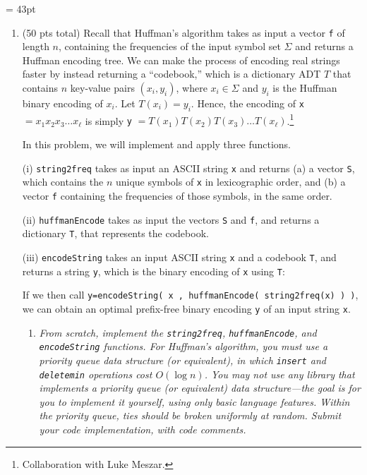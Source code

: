\documentclass[12pt]{article}
\begin{document}
\renewcommand{\headrulewidth}{0.4pt}
\headheight = 43pt

\renewcommand{\arraystretch}{1.5}

\vspace{-3mm}
\begin{enumerate}
		 
	\item \label{q:1} (50 pts total) Recall that Huffman's algorithm takes as input a vector {\tt f} of length $n$, containing the frequencies of the input symbol set $\Sigma$ and returns a Huffman encoding tree. We can make 
the process of encoding real strings faster by instead returning a ``codebook,'' which is a dictionary ADT $T$ that contains $n$ key-value pairs $(x_{i},y_{i})$, where $x_{i}\in \Sigma$ and $y_{i}$ is the Huffman binary encoding of 
$x_{i}$. Let $T(x_{i})=y_{i}$. Hence, the encoding of {\tt x} $=x_{1}x_{2}x_{3}\dots x_{\ell}$ is simply {\tt y} $=T(x_{1})T(x_{2})T(x_{3})\dots T(x_{\ell})$.\footnote{Collaboration with Luke Meszar.}

	In this problem, we will implement and apply three functions.
	
	(i) {\tt string2freq} takes as input an ASCII string {\tt x} and returns (a) a vector {\tt S}, which contains the $n$ unique symbols of {\tt x} in lexicographic order, and (b) a vector {\tt f} containing the frequencies of 
those symbols, in the same order. 
	
	(ii) {\tt huffmanEncode} takes as input the vectors {\tt S} and {\tt f}, and returns a dictionary {\tt T}, that represents the codebook.
	
	(iii) {\tt encodeString} takes an input ASCII string {\tt x} and a codebook {\tt T}, and returns a string {\tt y}, which is the binary encoding of {\tt x} using {\tt T}:

	If we then call {\tt y=encodeString( x , huffmanEncode( string2freq(x) ) )}, we can obtain an optimal prefix-free binary encoding {\tt y} of an input string {\tt x}.
	
	
	\begin{enumerate}
	\item \label{q:1:code} \textit{From scratch, implement the {\tt string2freq}, {\tt huffmanEncode}, and {\tt encodeString} functions. For Huffman's algorithm, you must use a priority queue data structure (or equivalent), in 
which {\tt insert} and {\tt deletemin} operations cost $O(\log n)$. You may not use any library that implements a priority queue (or equivalent) data structure---the goal is for you to implement it yourself, using only basic 
language features. Within the priority queue, ties should be broken uniformly at random. Submit your code implementation, with code comments.}
	

\end{enumerate}
\end{enumerate}
\end{document}
